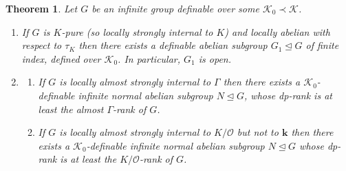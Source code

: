 \documentclass[11pt]{amsart}
\newtheorem{theorem}{Theorem}[section]
\theoremstyle{definition}
\newcommand{\bk}{\textbf{k}}
\newcommand{\CK}{{\mathcal K}}
\newcommand{\CO}{{\mathcal O}}
\newcommand{\0}{\emptyset}
\begin{document}
\begin{theorem}\label{T:johnson question}
    Let $G$ be an infinite group definable over some $\CK_0\prec \CK$. 
    \begin{enumerate}
        \item If $G$ is $K$-pure (so locally strongly internal to $K$) and locally abelian with respect to $\tau_K$ then there exists a definable abelian subgroup  $G_1\trianglelefteq G$ of finite index, defined over $\CK_0$. In particular, $G_1$ is open. 
        
        \item 
        \begin{enumerate}
            \item If $G$ is locally almost strongly internal to $\Gamma$ then  there exists a $\CK_0$-definable infinite normal abelian subgroup $N\trianglelefteq G$, whose dp-rank is at least the almost $\Gamma$-rank of $G$.
        
     
            \item If $G$ is locally almost strongly internal to $K/\CO$ but not to $\bk$ then  there exists a $\CK_0$-definable infinite normal abelian subgroup $N\trianglelefteq G$ whose dp-rank is at least the $K/\CO$-rank of $G$.
\end{enumerate}       
    \end{enumerate}
    
\end{theorem}
\end{document}
